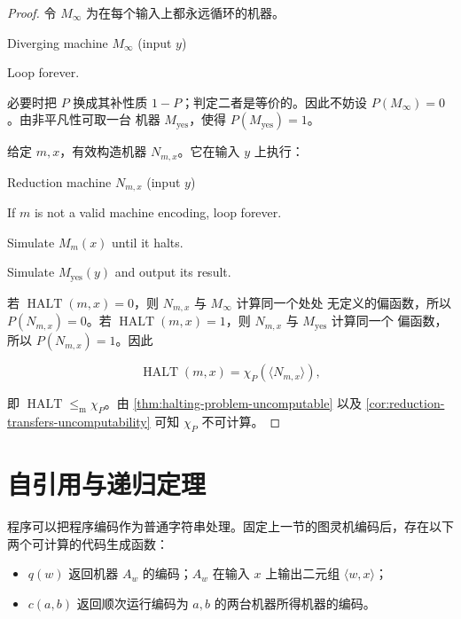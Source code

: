 \begin{proof}
  令 $M_\infty$ 为在每个输入上都永远循环的机器。

  \begin{pseudocode}{Diverging machine $M_\infty$ (input $y$)}
    \item Loop forever.
  \end{pseudocode}

  必要时把 $P$ 换成其补性质
  $1-P$；判定二者是等价的。因此不妨设 $P(M_\infty)=0$。由非平凡性可取一台
  机器 $M_{\mathrm{yes}}$，使得 $P(M_{\mathrm{yes}})=1$。

  给定 $m,x$，有效构造机器 $N_{m,x}$。它在输入 $y$ 上执行：

  \begin{pseudocode}{Reduction machine $N_{m,x}$ (input $y$)}
    \item If $m$ is not a valid machine encoding, loop forever.
    \item Simulate $M_m(x)$ until it halts.
    \item Simulate $M_{\mathrm{yes}}(y)$ and output its result.
  \end{pseudocode}

  若 $\operatorname{HALT}(m,x)=0$，则 $N_{m,x}$ 与 $M_\infty$ 计算同一个处处
  无定义的偏函数，所以 $P(N_{m,x})=0$。若
  $\operatorname{HALT}(m,x)=1$，则 $N_{m,x}$ 与 $M_{\mathrm{yes}}$ 计算同一个
  偏函数，所以 $P(N_{m,x})=1$。因此

  \[
    \operatorname{HALT}(m,x)
      =\chi_P(\langle N_{m,x}\rangle),
  \]

  即 $\operatorname{HALT}\leq_{\mathrm m}\chi_P$。由
  \cref{thm:halting-problem-uncomputable} 以及
  \cref{cor:reduction-transfers-uncomputability} 可知 $\chi_P$ 不可计算。
\end{proof}

\lecture
\label{lec:recursion-and-incompleteness}

\section{自引用与递归定理}

程序可以把程序编码作为普通字符串处理。固定上一节的图灵机编码后，存在以下
两个可计算的代码生成函数：

\begin{itemize}
  \item $q(w)$ 返回机器 $A_w$ 的编码；$A_w$ 在输入 $x$ 上输出二元组
    $\langle w,x\rangle$；
  \item $c(a,b)$ 返回顺次运行编码为 $a,b$ 的两台机器所得机器的编码。
\end{itemize}

